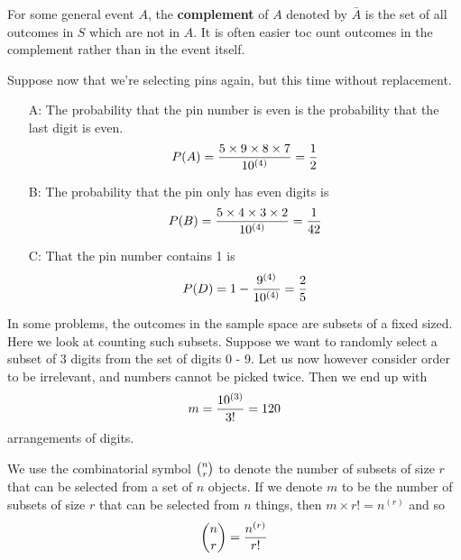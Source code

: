 \documentclass[english, 11pt]{article}
\begin{document}
  \begin{defn}[complement]\label{complement}
    For some general event $A$, the \textbf{complement} of $A$ denoted by $\bar{A}$ is the set of all outcomes in $S$ which are not in $A$. It is often easier toc ount outcomes in the complement rather than in the event itself.
  \end{defn}

  \begin{exmp}
    Suppose now that we're selecting pins again, but this time without replacement.
    \begin{itemize}
      \item[A:] The probability that the pin number is even is the probability that the last digit is even.
      \[ P(A) = \frac{5 \times 9 \times 8 \times 7}{10^{(4)}} = \frac{1}{2} \]
      \item[B:] The probability that the pin only has even digits is
      \[ P(B) = \frac{5\times4\times3\times2}{10^{(4)}} = \frac{1}{42} \]
      \item[C:] That the pin number contains 1 is
      \[ P(D) = 1 - \frac{9^{(4)}}{10^{(4)}} = \frac{2}{5} \]
    \end{itemize}
  \end{exmp}

  In some problems, the outcomes in the sample space are subsets of a fixed sized. Here we look at counting such subsets. Suppose we want to randomly select a subset of 3 digits from the set of digits 0 - 9. Let us now however consider order to be irrelevant, and numbers cannot be picked twice. Then we end up with
  \[ m = \frac{10^{(3)}}{3!} = 120 \]
  arrangements of digits.

  \begin{defn}
    We use the combinatorial symbol ${n \choose r}$ to denote the number of subsets of size $r$ that can be selected from a set of $n$ objects. If we denote $m$ to be the number of subsets of size $r$ that can be selected from $n$ things, then $m \times r! = n^{(r)}$ and so
    \[ {n \choose r} = \frac{n^{(r)}}{r!} \]
  \end{defn}
\end{document}
